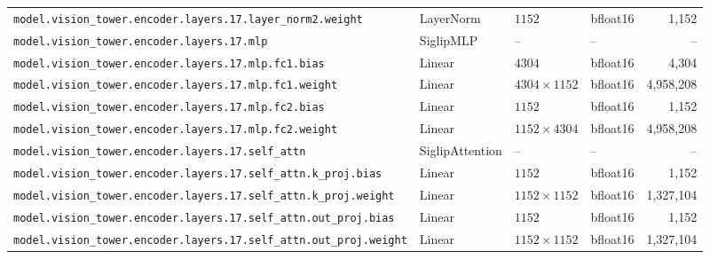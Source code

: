 \documentclass[10pt,a4paper]{article}
\theoremstyle{definition}
\begin{document}
\begin{appendices}
{\begin{longtable}{p{6.8cm}>{\raggedright\arraybackslash}p{3.3cm}llr}
\texttt{model.\allowbreak{}vision\_tower.\allowbreak{}encoder.\allowbreak{}layers.\allowbreak{}17.\allowbreak{}layer\_norm2.\allowbreak{}weight} & Layer\allowbreak{}Norm & $1152$ & bfloat16 & 1,152 \\
\texttt{model.\allowbreak{}vision\_tower.\allowbreak{}encoder.\allowbreak{}layers.\allowbreak{}17.\allowbreak{}mlp} & Siglip\allowbreak{}MLP & -- & -- & -- \\
\texttt{model.\allowbreak{}vision\_tower.\allowbreak{}encoder.\allowbreak{}layers.\allowbreak{}17.\allowbreak{}mlp.\allowbreak{}fc1.\allowbreak{}bias} & Linear & $4304$ & bfloat16 & 4,304 \\
\texttt{model.\allowbreak{}vision\_tower.\allowbreak{}encoder.\allowbreak{}layers.\allowbreak{}17.\allowbreak{}mlp.\allowbreak{}fc1.\allowbreak{}weight} & Linear & $4304 \times 1152$ & bfloat16 & 4,958,208 \\
\texttt{model.\allowbreak{}vision\_tower.\allowbreak{}encoder.\allowbreak{}layers.\allowbreak{}17.\allowbreak{}mlp.\allowbreak{}fc2.\allowbreak{}bias} & Linear & $1152$ & bfloat16 & 1,152 \\
\texttt{model.\allowbreak{}vision\_tower.\allowbreak{}encoder.\allowbreak{}layers.\allowbreak{}17.\allowbreak{}mlp.\allowbreak{}fc2.\allowbreak{}weight} & Linear & $1152 \times 4304$ & bfloat16 & 4,958,208 \\
\texttt{model.\allowbreak{}vision\_tower.\allowbreak{}encoder.\allowbreak{}layers.\allowbreak{}17.\allowbreak{}self\_attn} & Siglip\allowbreak{}Attention & -- & -- & -- \\
\texttt{model.\allowbreak{}vision\_tower.\allowbreak{}encoder.\allowbreak{}layers.\allowbreak{}17.\allowbreak{}self\_attn.\allowbreak{}k\_proj.\allowbreak{}bias} & Linear & $1152$ & bfloat16 & 1,152 \\
\texttt{model.\allowbreak{}vision\_tower.\allowbreak{}encoder.\allowbreak{}layers.\allowbreak{}17.\allowbreak{}self\_attn.\allowbreak{}k\_proj.\allowbreak{}weight} & Linear & $1152 \times 1152$ & bfloat16 & 1,327,104 \\
\texttt{model.\allowbreak{}vision\_tower.\allowbreak{}encoder.\allowbreak{}layers.\allowbreak{}17.\allowbreak{}self\_attn.\allowbreak{}out\_proj.\allowbreak{}bias} & Linear & $1152$ & bfloat16 & 1,152 \\
\texttt{model.\allowbreak{}vision\_tower.\allowbreak{}encoder.\allowbreak{}layers.\allowbreak{}17.\allowbreak{}self\_attn.\allowbreak{}out\_proj.\allowbreak{}weight} & Linear & $1152 \times 1152$ & bfloat16 & 1,327,104 \\

\end{longtable}}
\end{appendices}
\end{document}
